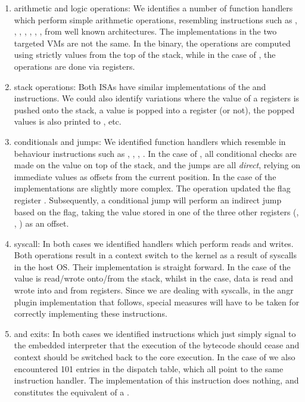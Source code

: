 \begin{enumerate}
    \item arithmetic and logic operations: We identifies a number of function handlers which perform simple arithmetic operations, resembling instructions such as , , , , , , , from well known architectures. The implementations in the two targeted \glspl{VM} are not the same. In the  binary, the operations are computed using strictly values from the top of the stack, while in the case of , the operations are done via registers.
    \item stack operations: Both \glspl{ISA} have similar implementations of the  and  instructions. We could also identify variations where the value of a registers is pushed onto the stack, a value is popped into a register (or not), the popped values is also printed to , etc.
    \item conditionals and jumps: We identified function handlers which resemble in behaviour instructions such as , , , . In the case of , all conditional checks are made on the value on top of the stack, and the jumps are all \emph{direct}, relying on immediate values as offsets from the current position. In the case of  the implementations are slightly more complex. The  operation updated the flag register . Subsequently, a conditional jump will perform an indirect jump based on the  flag, taking the value stored in one of the three other registers  (, , ) as an offset.
    \item \gls{syscall}: In both cases we identified handlers which perform reads and writes. Both operations result in a context switch to the kernel as a result of \glspl{syscall} in the host \gls{OS}. Their implementation is straight forward. In the case of  the value is read/wrote onto/from the stack, whilst in the  case, data is read and wrote into and from registers. Since we are dealing with \glspl{syscall}, in the angr plugin implementation that follows, special measures will have to be taken for correctly implementing these instructions.
    \item {} and exits: In both cases we identified  instructions which just simply signal to the embedded interpreter that the execution of the bytecode should cease and context should be switched back to the core execution. In the case of  we also encountered 101 entries in the dispatch table, which all point to the same instruction handler. The implementation of this instruction does nothing, and constitutes the equivalent of a .

\end{enumerate}
